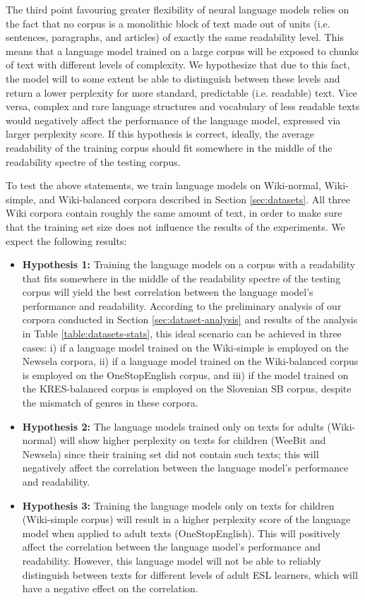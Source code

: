 \documentclass{clv3}
\begin{document}
The third point favouring greater flexibility of neural language models relies on the fact that no corpus is a monolithic block of text made out of units (i.e. sentences, paragraphs, and articles) of exactly the same readability level. This means that a language model trained on a large corpus will be exposed to chunks of text with different levels of complexity. We hypothesize that due to this fact, the model will to some extent be able to distinguish between these levels and return a lower perplexity for more standard, predictable (i.e. readable) text. Vice versa, complex and rare language structures and vocabulary of less readable texts would negatively affect the performance of the language model, expressed via larger perplexity score. If this hypothesis is correct, ideally, the average readability of the training corpus should fit somewhere in the middle of the readability spectre of the testing corpus. 

To test the above statements, we train language models on Wiki-normal, Wiki-simple, and Wiki-balanced corpora described in Section \ref{sec:datasets}. All three Wiki corpora contain roughly the same amount of text, in order to make sure that the training set size does not influence the results of the experiments. 
 We expect the following results:
\begin{itemize}
    \item \textbf{Hypothesis 1:} Training the language models on a corpus with a readability that fits somewhere in the middle of the readability spectre of the testing corpus will yield the best correlation between the language model's performance and readability. According to the preliminary analysis of our corpora conducted in Section \ref{sec:dataset-analysis} and results of the analysis in Table \ref{table:datasets-stats}, this ideal scenario can be achieved in three cases: i) if a language model trained on the Wiki-simple is employed on the Newsela corpora, ii) if a language model trained on the Wiki-balanced corpus is employed on the OneStopEnglish corpus,  and iii) if the model trained on the KRES-balanced corpus is employed on the Slovenian SB corpus, despite the mismatch of genres in these corpora.
    \item \textbf{Hypothesis 2:} The language models trained only on texts for adults (Wiki-normal) will show higher perplexity on texts for children (WeeBit and Newsela) since their training set did not contain such texts; this will negatively affect the correlation between the language model's performance and readability.
    \item \textbf{Hypothesis 3:} Training the language models only on texts for children (Wiki-simple corpus) will result in a higher perplexity score of the language model when applied to adult texts (OneStopEnglish). This will positively affect the correlation between the language model's performance and readability. However, this language model will not be able to reliably distinguish between texts for different levels of adult ESL learners, which will have a negative effect on the correlation. 
\end{itemize}
 
\end{document}
